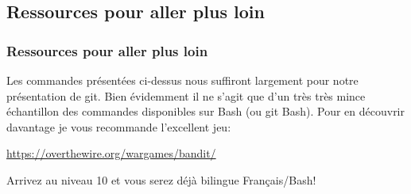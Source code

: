 \documentclass{beamer}
\begin{document}
\subsection{Ressources pour aller plus loin}

\begin{frame}[fragile]
\frametitle{Ressources pour aller plus loin}
Les commandes présentées ci-dessus nous suffiront largement pour notre présentation de git. Bien évidemment il ne s'agit que d'un très très mince échantillon des commandes disponibles sur Bash (ou git Bash). Pour en découvrir davantage je vous recommande l'excellent jeu:
\bigskip

\begin{center}
    \url{https://overthewire.org/wargames/bandit/}
\end{center}
\bigskip

Arrivez au niveau 10 et vous serez déjà bilingue Français/Bash!

\end{frame}
\end{document}
